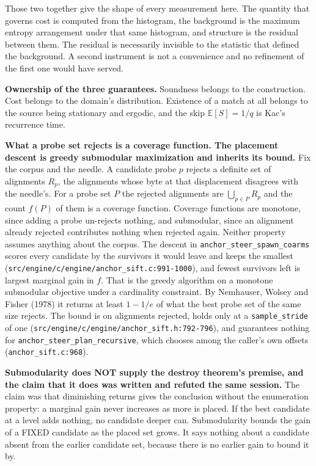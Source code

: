 Those two together give the shape of every measurement here. The quantity that governs cost is computed from the histogram, the background is the maximum entropy arrangement under that same histogram, and structure is the residual between them. The residual is necessarily invisible to the statistic that defined the background. A second instrument is not a convenience and no refinement of the first one would have served.

\textbf{Ownership of the three guarantees.} Soundness belongs to the construction. Cost belongs to the domain's distribution. Existence of a match at all belongs to the source being stationary and ergodic, and the skip \(\mathbb{E}[S] = 1/q\) is Kac's recurrence time.

\textbf{What a probe set rejects is a coverage function. The placement descent is greedy submodular maximization and inherits its bound.} Fix the corpus and the needle. A candidate probe \(p\) rejects a definite set of alignments \(R_p\), the alignments whose byte at that displacement disagrees with the needle's. For a probe set \(P\) the rejected alignments are \(\bigcup_{p \in P} R_p\) and the count \(f(P)\) of them is a coverage function. Coverage functions are monotone, since adding a probe un-rejects nothing, and submodular, since an alignment already rejected contributes nothing when rejected again. Neither property assumes anything about the corpus. The descent in \texttt{anchor\_steer\_spawn\_coarms} scores every candidate by the survivors it would leave and keeps the smallest (\texttt{src/\allowbreak{}engine/\allowbreak{}c/\allowbreak{}engine/\allowbreak{}anchor\_sift.c:991-1000}), and fewest survivors left is largest marginal gain in \(f\). That is the greedy algorithm on a monotone submodular objective under a cardinality constraint. By Nemhauser, Wolsey and Fisher (1978) it returns at least \(1 - 1/e\) of what the best probe set of the same size rejects. The bound is on alignments rejected, holds only at a \texttt{sample\_stride} of one (\texttt{src/\allowbreak{}engine/\allowbreak{}c/\allowbreak{}engine/\allowbreak{}anchor\_sift.h:792-796}), and guarantees nothing for \texttt{anchor\_steer\_plan\_recursive}, which chooses among the caller's own offsets (\texttt{anchor\_sift.c:968}).

\textbf{Submodularity does NOT supply the destroy theorem's premise, and the claim that it does was written and refuted the same session.} The claim was that diminishing returns gives the conclusion without the enumeration property: a marginal gain never increases as more is placed. If the best candidate at a level adds nothing, no candidate deeper can. Submodularity bounds the gain of a FIXED candidate as the placed set grows. It says nothing about a candidate absent from the earlier candidate set, because there is no earlier gain to bound it by.

